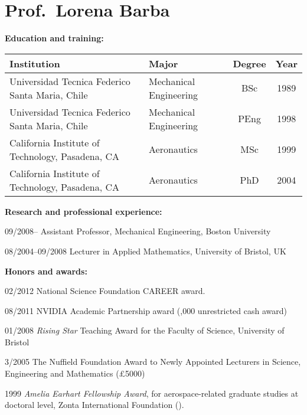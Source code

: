 \documentclass{proposalnsf}
\begin{document}
{}
\renewcommand{\thepage} {\footnotesize Bio.\,---\,\arabic{page}}
\section*{Prof.\ Lorena Barba}

\small
\textbf{Education and training:} 

\begin{tabular}{llcc}
Institution & Major & Degree & Year \\ \hline
Universidad Tecnica Federico Santa Maria, Chile   &   Mechanical Engineering & BSc & 1989 \\
Universidad Tecnica Federico Santa Maria, Chile   &   Mechanical Engineering & PEng & 1998 \\
California Institute of Technology, Pasadena, CA   &   Aeronautics & MSc & 1999 \\
California Institute of Technology, Pasadena, CA  &   Aeronautics & PhD & 2004 \\
\end{tabular}

\textbf{Research and professional experience:} 

09/2008-- \qquad Assistant Professor, Mechanical Engineering, Boston University

08/2004--09/2008 \qquad Lecturer in Applied Mathematics, University of Bristol, UK


\textbf{Honors and awards:} 

02/2012 \quad  National Science Foundation CAREER award.

08/2011 \quad  NVIDIA Academic Partnership award (,000 unrestricted cash award)
  
01/2008 \quad  \textit{Rising Star} Teaching Award for the Faculty of Science,
  University of Bristol
  
3/2005 \quad   The Nuffield   Foundation Award to Newly Appointed Lecturers in
  Science, Engineering and Mathematics (\pounds 5000)

1999 \qquad  \textit{Amelia Earhart Fellowship Award}, for aerospace-related
  graduate studies at doctoral level, Zonta International Foundation ().
\end{document}
